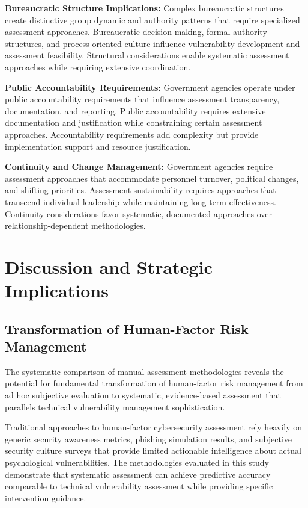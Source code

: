 \documentclass[10pt, twocolumn]{article}
\begin{document}
\textbf{Bureaucratic Structure Implications:} Complex bureaucratic structures create distinctive group dynamic and authority patterns that require specialized assessment approaches. Bureaucratic decision-making, formal authority structures, and process-oriented culture influence vulnerability development and assessment feasibility. Structural considerations enable systematic assessment approaches while requiring extensive coordination.

\textbf{Public Accountability Requirements:} Government agencies operate under public accountability requirements that influence assessment transparency, documentation, and reporting. Public accountability requires extensive documentation and justification while constraining certain assessment approaches. Accountability requirements add complexity but provide implementation support and resource justification.

\textbf{Continuity and Change Management:} Government agencies require assessment approaches that accommodate personnel turnover, political changes, and shifting priorities. Assessment sustainability requires approaches that transcend individual leadership while maintaining long-term effectiveness. Continuity considerations favor systematic, documented approaches over relationship-dependent methodologies.

\section{Discussion and Strategic Implications}

\subsection{Transformation of Human-Factor Risk Management}

The systematic comparison of manual assessment methodologies reveals the potential for fundamental transformation of human-factor risk management from ad hoc subjective evaluation to systematic, evidence-based assessment that parallels technical vulnerability management sophistication.

Traditional approaches to human-factor cybersecurity assessment rely heavily on generic security awareness metrics, phishing simulation results, and subjective security culture surveys that provide limited actionable intelligence about actual psychological vulnerabilities. The methodologies evaluated in this study demonstrate that systematic assessment can achieve predictive accuracy comparable to technical vulnerability assessment while providing specific intervention guidance.
\end{document}
